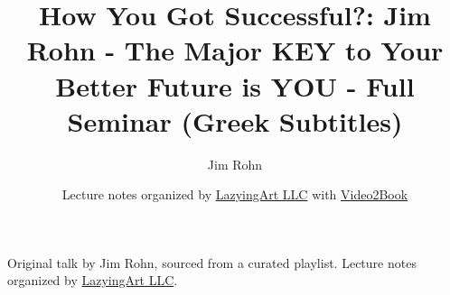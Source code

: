 \documentclass[11pt,oneside]{book}
\begin{document}
\frontmatter
\title{How You Got Successful?: Jim Rohn - The Major KEY to Your Better Future is YOU - Full Seminar (Greek Subtitles)}
\author{Jim Rohn}
\date{Lecture notes organized by \href{https://lazying.art}{LazyingArt LLC} with \href{https://github.com/lachlanchen/Video2Book}{Video2Book}}
\maketitle
\begin{center}
\small Original talk by Jim Rohn, sourced from a curated playlist. Lecture notes organized by \href{https://lazying.art}{LazyingArt LLC}.
\end{center}
\clearpage
\mainmatter

\end{document}
